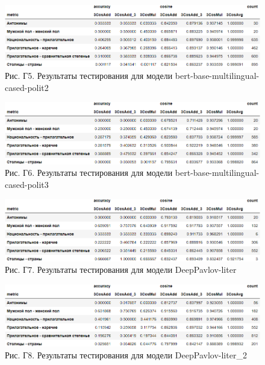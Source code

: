 \documentclass[a4paper,14pt]{article}
\begin{document}
\begin{figure}[H]
	\centering
	\includegraphics[width=0.9\linewidth]{image/res_bert-base-multilingual-cased-polit2 }
	\caption*{Рис. Г5. Результаты тестирования для модели bert-base-multilingual-cased-polit2 }
	\label{fig:resbert-base-multilingual-cased-polit2 }
\end{figure}

\begin{figure}[H]
	\centering
	\includegraphics[width=0.9\linewidth]{image/res_bert-base-multilingual-cased-polit3 }
	\caption*{Рис. Г6. Результаты тестирования для модели bert-base-multilingual-cased-polit3 }
	\label{fig:resbert-base-multilingual-cased-polit3 }
\end{figure}

\begin{figure}[H]
	\centering
	\includegraphics[width=0.9\linewidth]{image/res_DeepPavlov-liter }
	\caption*{Рис. Г7. Результаты тестирования для модели DeepPavlov-liter }
	\label{fig:resDeepPavlov-liter }
\end{figure}

\begin{figure}[H]
	\centering
	\includegraphics[width=0.9\linewidth]{image/res_DeepPavlov-liter_2 }
	\caption*{Рис. Г8. Результаты тестирования для модели DeepPavlov-liter\_2 }
	\label{fig:resDeepPavlov-liter2 }
\end{figure}
\end{document}
